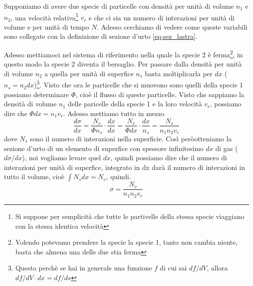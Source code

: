 \documentclass[11pt,a4paper]{article}
\begin{document}
		Supponiamo di avere due specie di particelle con densità per unità di volume $n_1$ e $n_2$, una velocità relativa\footnote{Si suppone per semplicità che tutte le partivelle della stessa specie viaggiano con la stessa identica velocità} $v_r$ e che ci sia un numero di interazioni per unità di volume e per unità di tempo $N$.\newline
		Adesso cerchiamo di vedere come queste variabili sono collegate con la definizione di sezione d'urto \ref{eq:sez_lastra}.\newline

		Adesso mettiamoci nel sistema di riferimento nella quale la specie 2 è ferma\footnote{Volendo potevamo prendere la specie la specie 1, tanto non cambia niente, basta che almeno una delle due stia ferma}, in questo modo la specie 2 diventa il bersaglio.\newline
		Per passare dalla densità per unità di volume $n_2$ a quella per unità di superfice $n_s$ basta moltiplicarla per $dx$ ($n_s=n_2dx$)\footnote{Questo perchè se hai in generale una funzione $f$ di cui sai $df/dV$, allora $df/dV\cdot dx=df/ds$}.\newline
		Visto che ora le particelle che si muovono sono quelli della specie 1 possiamo determinare $\Phi$, cioè il flusso di queste particelle. Visto che sappiamo la densità di volume $n_1$ delle paricelle della specie 1 e la loro velocità $v_r$, possiamo dire che $\Phi dx=n_1v_r$. Adesso mettiamo tutto in mezzo\newline
		\[
			\frac{d\sigma}{dx}=\frac{N_s}{\Phi n_s}\cdot\frac{dx}{dx}=\frac{N_s}{\Phi dx}\cdot\frac{dx}{n_s}=\frac{N_s}{n_1n_2v_r}
		\]
		dove $N_s$ sono il numero di interazioni nella superficie.\newline
		Così  peròotteniamo la sezione d'urto di un elemento di superfice con spessore infinitesimo $dx$ di gas ($d\sigma/dx$), noi vogliamo levare quel $dx$, quindi possiamo dire che il numero di interazioni per unità di superfice, integrato in dx darà il numero di interazioni in tutto il volume, cioè $\int N_sdx=N_v$, quindi.
		\begin{equation}
			\sigma=\frac{N_v}{n_1n_2v_r}
			\label{eq:gas}
		\end{equation} 
\end{document}
